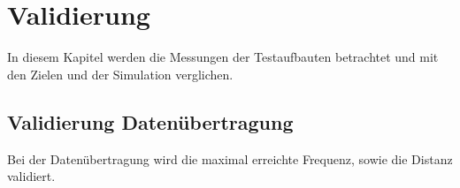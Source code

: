 \section{Validierung}
\label{sec:Validierung}
In diesem Kapitel werden die Messungen der Testaufbauten betrachtet und mit den Zielen und der Simulation verglichen.


\subsection{Validierung Datenübertragung}
Bei der Datenübertragung wird die maximal erreichte Frequenz, sowie die Distanz validiert.

